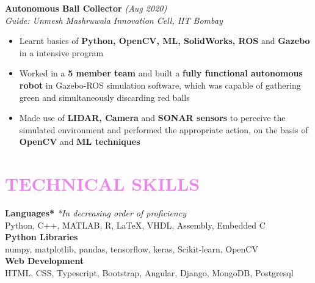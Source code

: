 \documentclass[a4paper,11pt]{article}
\begin{document}
\textbf{Autonomous Ball Collector} \hfill \emph{(Aug 2020)}\\
\emph{Guide: Unmesh Mashruwala Innovation Cell, IIT Bombay} 
\vspace{-7pt}
\begin{itemize}[noitemsep]
    \item Learnt basics of \textbf{Python, OpenCV, ML, SolidWorks, ROS} and \textbf{Gazebo} in a intensive program
    \item Worked in a \textbf{5 member team} and built a \textbf{fully functional autonomous robot} in Gazebo-ROS simulation software, which was capable of gathering green and simultaneously discarding red balls
    \item Made use of \textbf{LIDAR, Camera} and \textbf{SONAR sensors} to perceive the simulated environment and performed the appropriate action, on the basis of \textbf{OpenCV} and \textbf{ML techniques}
\end{itemize}
\vspace{-5mm}


\section{\textcolor{Violet}{\textbf{\Large{T}\large{ECHNICAL} \Large{S}\large{KILLS}}}}
\vspace{-5pt}
    \textbf{Languages*} \hfill \emph{*In decreasing order of proficiency}\\
    Python, C++, MATLAB, R, \LaTeX, VHDL, Assembly, Embedded C\\ 
    \textbf{Python Libraries}\\
    numpy, matplotlib, pandas, tensorflow, keras, Scikit-learn, OpenCV\\ 
    \textbf{Web Development}\\
    HTML, CSS, Typescript, Bootstrap, Angular, Django, MongoDB, Postgresql
\vspace{-2.5mm}
\end{document}
